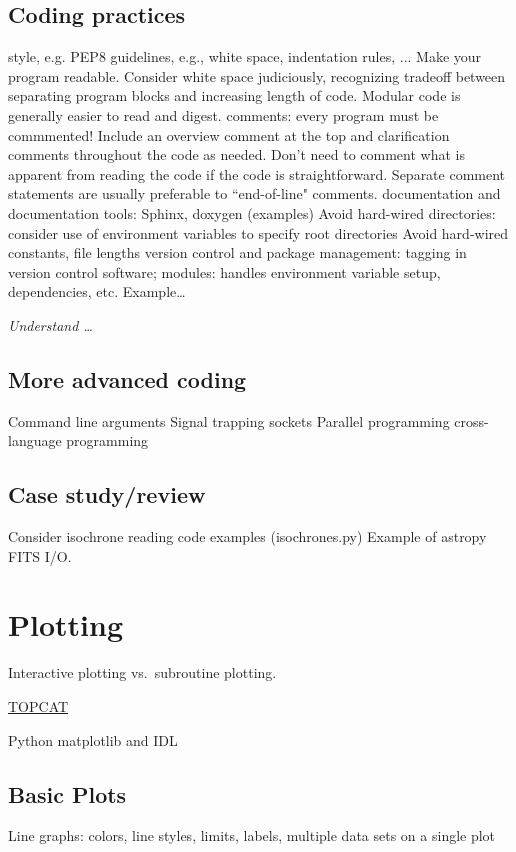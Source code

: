 \documentclass{article}
\newcommand{\test}[1]{%
    \begin{center}
        \colorbox{hl}{\parbox{0.9\textwidth}{\emph{#1}}}
    \end{center}}
\begin{document}
\subsection{Coding practices}
style, e.g. PEP8 guidelines, e.g., white space, indentation rules, ...
Make your program readable. Consider white space judiciously,
recognizing tradeoff between separating program blocks and increasing
length of code. Modular code is generally easier to read and digest.
comments: every program must be commmented! Include an overview
comment at the top and clarification comments throughout the code as
needed. Don't need to comment what is apparent from reading the code
if the code is straightforward. Separate comment statements are
usually preferable to ``end-of-line" comments.
documentation and documentation tools: Sphinx, doxygen (examples)
Avoid hard-wired directories: consider use of environment variables to
specify root directories
Avoid hard-wired constants, file lengths
version control and package management: tagging in version control
software; modules: handles environment variable setup, dependencies,
etc. Example\ldots

\test{Understand \ldots}

\subsection{More advanced coding}
Command line arguments
Signal trapping
sockets
Parallel programming
cross-language programming

\subsection{Case study/review}
Consider isochrone reading code examples (isochrones.py)
Example of astropy FITS I/O.

\newpage
\section{Plotting}
Interactive plotting vs.\ subroutine plotting.

\href{http://www.star.bris.ac.uk/~mbt/topcat/}{TOPCAT}

Python matplotlib and IDL

\subsection{Basic Plots}
Line graphs: colors, line styles, limits, labels, multiple data sets
on a single plot
\end{document}
